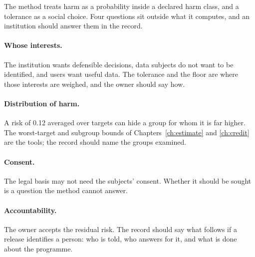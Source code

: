 The method treats harm as a probability inside a declared harm class, and a tolerance as a
social choice. Four questions sit outside what it computes, and an institution should answer
them in the record.

\paragraph{Whose interests.} The institution wants defensible decisions, data subjects do not
want to be identified, and users want useful data. The tolerance and the floor are where those
interests are weighed, and the owner should say how.
\paragraph{Distribution of harm.} A risk of 0.12 averaged over targets can hide a group for
whom it is far higher. The worst-target and subgroup bounds of Chapters~\ref{ch:estimate} and
\ref{ch:credit} are the tools; the record should name the groups examined.
\paragraph{Consent.} The legal basis may not need the subjects' consent. Whether it should be
sought is a question the method cannot answer.
\paragraph{Accountability.} The owner accepts the residual risk. The record should say what
follows if a release identifies a person: who is told, who answers for it, and what is done
about the programme.
